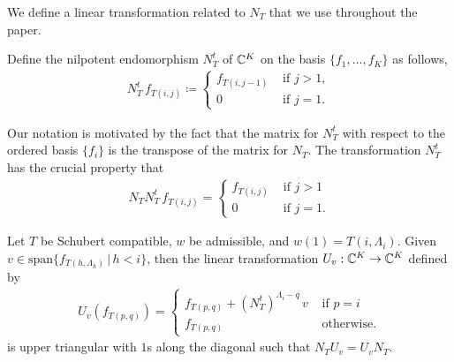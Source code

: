\documentclass[12pt]{amsart}
\newcommand{\st}{\,|\,}
\newcommand{\vspan}{\mathrm{span}}
\begin{document}
We define a linear transformation related to $N_T$ that we use throughout the paper.
\begin{definition}\label{def:NTranspose}
Define the nilpotent endomorphism $N^t_T$ of $\mathbb{C}^K$ on the basis $\{f_1,\dots, f_K\}$ as follows,
\begin{align}
N^t_T \,f_{T(i,j)} \coloneqq \begin{cases} f_{T(i,j-1)} & \text{ if } j>1,\\ 0 & \text{ if }j = 1.\end{cases}
\end{align}
\end{definition}
Our notation is motivated by the fact that the matrix for $N^t_T$ with respect to the ordered basis $\{f_i\}$ is the transpose of the matrix for $N_T$. The transformation $N^t_T$ has the crucial property that 
\begin{align}\label{eq:NNTranspose}
N_TN^t_T \,f_{T(i,j)} = \begin{cases} f_{T(i,j)} &\text{ if } j > 1\\ 0 &\text{ if } j = 1.\end{cases}
\end{align}




\begin{lemma}\label{lem:InvertibleTransf}
Let $T$ be Schubert compatible, $w$ be admissible, and $w(1) = T(i,\Lambda_i)$. Given $v\in \vspan\{f_{T(h,\Lambda_h)}\st h<i\}$, then the linear transformation $U_v: \mathbb{C}^K\to \mathbb{C}^K$ defined by
\begin{align}
    U_v(f_{T(p,q)}) = \begin{cases} f_{T(p,q)} + (N^t_T)^{\Lambda_i-q}\,v & \text{ if }p=i\\ f_{T(p,q)} & \text{ otherwise.}\end{cases}
\end{align}
is upper triangular with $1$s along the diagonal such that $N_TU_v = U_vN_T$.
\end{lemma}
\end{document}
